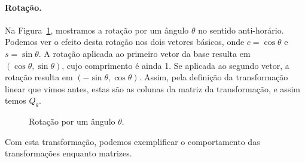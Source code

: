 \paragraph*{Rotação.} Na Figura~\ref{fig:rotacao}, mostramos a rotação por um ângulo $\theta$ no sentido anti-horário. Podemos ver o efeito desta rotação nos dois vetores básicos, onde $c=\cos{\theta}$ e $s=\sin{\theta}$. A rotação aplicada ao primeiro vetor da base resulta em $(\cos{\theta}, \sin{\theta})$, cujo comprimento é ainda 1. Se aplicada ao segundo vetor, a rotação resulta em $(-\sin{\theta},\cos{\theta})$. Assim, pela definição da transformação linear que vimos antes, estas são as colunas da matriz da transformação, e assim temos $Q_\theta$.
\begin{figure}[!h]
   \begin{center}
   \caption{Rotação por um ângulo $\theta$.}
   \label{fig:rotacao}
   \end{center}
\end{figure}
Com esta transformação, podemos exemplificar o comportamento das transformações enquanto matrizes.
